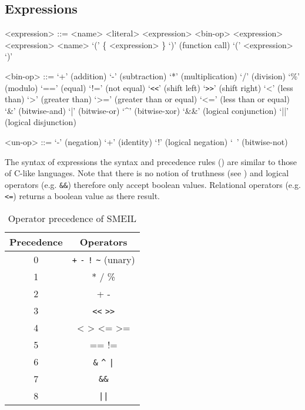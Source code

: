 \subsection{Expressions}
\begin{grammar}
  <expression> ::= <name>
  \alt <literal>
  \alt <expression> <bin-op> <expression>
   <expression>
  \alt <name> `(' \{ <expression> \}  `)' (function call)
  \alt `(' <expression> `)'

  <bin-op> ::= `+' (addition)
  \alt `-' (subtraction)
  \alt `*' (multiplication)
  \alt `/' (division)
  \alt `\%' (modulo)
  \alt `==' (equal)
  \alt `!=' (not equal)
  \alt `\verb!<<!' (shift left)
  \alt `\verb!>>!' (shift right)
  \alt `<' (less than)
  \alt `>' (greater than)
  \alt `>=' (greater than or equal)
  \alt `<=' (less than or equal)
  \alt `\&' (bitwise-and)
  \alt `|' (bitwise-or)
  \alt `^' (bitwise-xor)
  \alt `\&\&' (logical conjunction)
  \alt `||' (logical disjunction)

  <un-op> ::= `-' (negation)
  \alt `+' (identity)
  \alt `!' (logical negation)
  \alt `~' (bitwise-not)

\end{grammar}

The syntax of expressions the syntax and precedence rules () are
similar to those of C-like languages. Note that there is no notion of truthness
(see ) and logical operators (e.g. \texttt{\&\&}) therefore only
accept boolean values. Relational operators (e.g. \texttt{<=}) returns a boolean
value as there result. 


\begin{table}%
  \centering
\begin{tabular}{cc}
  \toprule
  \textbf{Precedence} & \textbf{Operators}\\
  \midrule
  0 & \verb!+! \verb!-! \verb|!| \verb!~! (unary)\\
  1 & * / \% \\
  2 & + - \\
  3 & \verb!<<! \verb!>>! \\
  4 & < > <= >= \\
  5 & == != \\
  6 & \verb!&! \verb!^! \verb!|! \\
  7 & \verb!&&! \\
  8 & \verb!||! \\
  \bottomrule
\end{tabular}
\caption{Operator precedence of SMEIL}
\label{tab:ops}
\end{table}

